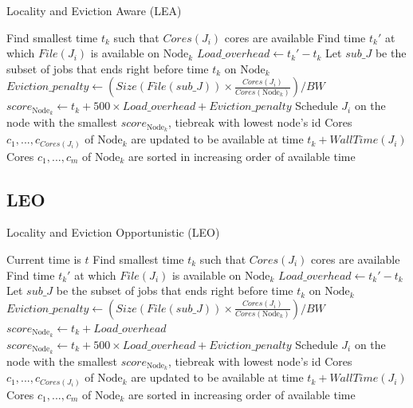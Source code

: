 \documentclass[conference,10pt]{IEEEtran}
\newcommand{\Node}[1]{\ensuremath{\mathrm{Node}_{#1}}\xspace}
\newcommand{\file}{\ensuremath{\mathit{File}}\xspace}
\newcommand{\size}{\ensuremath{\mathit{Size}}\xspace}
\newcommand{\bandwidth}{\mathit{BW}\xspace}
\newcommand{\core}{\mathit{Cores}\xspace}
\newcommand{\walltime}{\mathit{WallTime}\xspace}
\newcommand{\nodeset}{\ensuremath{\mathbb{N}}\xspace}
\begin{document}

\begin{algorithm*}[htb]%
\caption{Locality and Eviction Aware (LEA)}\label{algo.lea}
\begin{algorithmic}[1]
		\ForEach{$\Node{k} \in \nodeset$}
			\State Find smallest time $t_k$ such that $\core(J_i)$ cores are available
			\State Find time $t_k'$ at which $\file(J_i)$ is available on $\Node{k}$
			\State $Load\_overhead \gets t_k' - t_k$ 
			\State Let $\mathit{sub\_J}$ be the subset of jobs that ends right before time $t_k$ on $\Node{k}$
			\State $Eviction\_penalty \gets (\size(\file(\mathit{sub\_J})) \times \frac{\core(J_i)}{\core(\Node{k})})/\bandwidth$
			\State $score_{\Node{k}} \gets t_k + 500 \times Load\_overhead + Eviction\_penalty$
		\EndFor
		\State Schedule $J_i$ on the node with the smallest $score_{\Node{k}}$, tiebreak with lowest node's id
		\State Cores $c_1, ..., c_{\core(J_i)}$ of $\Node{k}$ are updated to be available at time $t_k + \walltime(J_i)$
		\State Cores $c_1, ..., c_m$ of $\Node{k}$ are sorted in increasing order of available time
	\EndFor
\end{algorithmic}
\end{algorithm*}

\subsection{LEO}

\begin{algorithm*}[htb]%
\caption{Locality and Eviction Opportunistic (LEO)}\label{algo.leo}
\begin{algorithmic}[1]
	\Statex Current time is $t$
		\ForEach{$\Node{k} \in \nodeset$}
			\State Find smallest time $t_k$ such that $\core(J_i)$ cores are available
			\State Find time $t_k'$ at which $\file(J_i)$ is available on $\Node{k}$
			\State $Load\_overhead \gets t_k' - t_k$ 
			\State Let $\mathit{sub\_J}$ be the subset of jobs that ends right before time $t_k$ on $\Node{k}$
			\State $Eviction\_penalty \gets (\size(\file(\mathit{sub\_J})) \times \frac{\core(J_i)}{\core(\Node{k})})/\bandwidth$
				\State $score_{\Node{k}} \gets t_k + Load\_overhead$
			\Else
				\State $score_{\Node{k}} \gets t_k + 500 \times Load\_overhead + Eviction\_penalty$
			\EndIf
		\EndFor
		\State Schedule $J_i$ on the node with the smallest $score_{\Node{k}}$, tiebreak with lowest node's id
		\State Cores $c_1, ..., c_{\core(J_i)}$ of $\Node{k}$ are updated to be available at time $t_k + \walltime(J_i)$
		\State Cores $c_1, ..., c_m$ of $\Node{k}$ are sorted in increasing order of available time
	\EndFor
\end{algorithmic}
\end{algorithm*}
\end{document}
